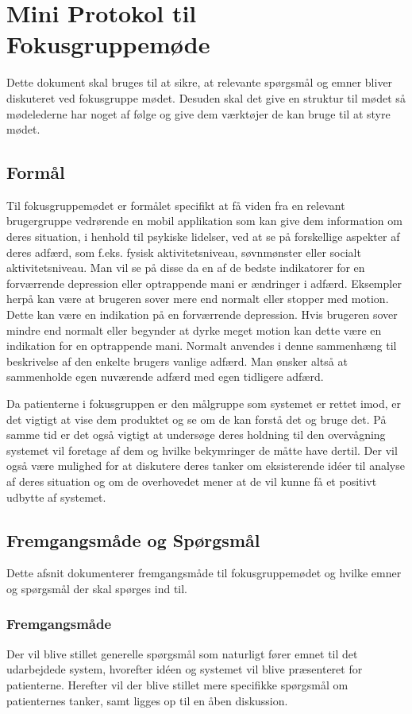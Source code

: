 \chapter*{Mini Protokol til Fokusgruppemøde}
Dette dokument skal bruges til at sikre, at relevante spørgsmål og emner bliver diskuteret ved fokusgruppe mødet.
Desuden skal det give en struktur til mødet så mødelederne har noget af følge og give dem værktøjer de kan bruge til at styre mødet.

\section*{Formål}
Til fokusgruppemødet er formålet specifikt at få viden fra en relevant brugergruppe vedrørende en mobil applikation som kan give dem information om deres situation, i henhold til psykiske lidelser, ved at se på forskellige aspekter af deres adfærd, som f.eks. fysisk aktivitetsniveau, søvnmønster eller socialt aktivitetsniveau. 
Man vil se på disse da en af de bedste indikatorer for en forværrende depression eller optrappende mani er ændringer i adfærd.
Eksempler herpå kan være at brugeren sover mere end normalt eller stopper med motion.
Dette kan være en indikation på en forværrende depression.
Hvis brugeren sover mindre end normalt eller begynder at dyrke meget motion kan dette være en indikation for en optrappende mani.
Normalt anvendes i denne sammenhæng til beskrivelse af den enkelte brugers vanlige adfærd.
Man ønsker altså at sammenholde egen nuværende adfærd med egen tidligere adfærd.
 
Da patienterne i fokusgruppen er den målgruppe som systemet er rettet imod, er det vigtigt at vise dem produktet og se om de kan forstå det og bruge det.
På samme tid er det også vigtigt at undersøge deres holdning til den overvågning systemet vil foretage af dem og hvilke bekymringer de måtte have dertil.
Der vil også være mulighed for at diskutere deres tanker om eksisterende idéer til analyse af deres situation og om de overhovedet mener at de vil kunne få et positivt udbytte af systemet.

\section*{Fremgangsmåde og Spørgsmål}
Dette afsnit dokumenterer fremgangsmåde til fokusgruppemødet og hvilke emner og spørgsmål der skal spørges ind til.

\subsection*{Fremgangsmåde}
Der vil blive stillet generelle spørgsmål som naturligt fører emnet til det udarbejdede system, hvorefter idéen og systemet vil blive præsenteret for patienterne. 
Herefter vil der blive stillet mere specifikke spørgsmål om patienternes tanker, samt ligges op til en åben diskussion.

